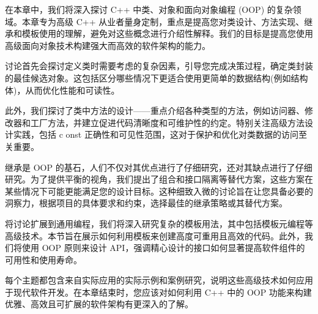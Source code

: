 
在本章中，我们将深入探讨 C++ 中类、对象和面向对象编程 (OOP) 的复杂领域。本章专为高级 C++ 从业者量身定制，重点是提高您对类设计、方法实现、继承和模板使用的理解，避免对这些概念进行介绍性解释。我们的目标是提高您使用高级面向对象技术构建强大而高效的软件架构的能力。

讨论首先会探讨定义类时需要考虑的复杂因素，引导您完成决策过程，确定类封装的最佳候选对象。这包括区分哪些情况下更适合使用更简单的数据结构(例如结构体)，从而优化性能和可读性。

此外，我们探讨了类中方法的设计——重点介绍各种类型的方法，例如访问器、修改器和工厂方法，并建立促进代码清晰度和可维护性的约定。特别关注高级方法设计实践，包括 c onst 正确性和可见性范围，这对于保护和优化对类数据的访问至关重要。

继承是 OOP 的基石，人们不仅对其优点进行了仔细研究，还对其缺点进行了仔细研究。为了提供平衡的视角，我们提出了组合和接口隔离等替代方案，这些方案在某些情况下可能更能满足您的设计目标。这种细致入微的讨论旨在让您具备必要的洞察力，根据项目的具体要求和约束，选择最佳的继承策略或其替代方案。

将讨论扩展到通用编程，我们将深入研究复杂的模板用法，其中包括模板元编程等高级技术。本节旨在展示如何利用模板来创建高度可重用且高效的代码。此外，我们将使用 OOP 原则来设计 API，强调精心设计的接口如何显著提高软件组件的可用性和使用寿命。

每个主题都包含来自实际应用的实际示例和案例研究，说明这些高级技术如何应用于现代软件开发。在本章结束时，您应该对如何利用 C++ 中的 OOP 功能来构建优雅、高效且可扩展的软件架构有更深入的了解。
